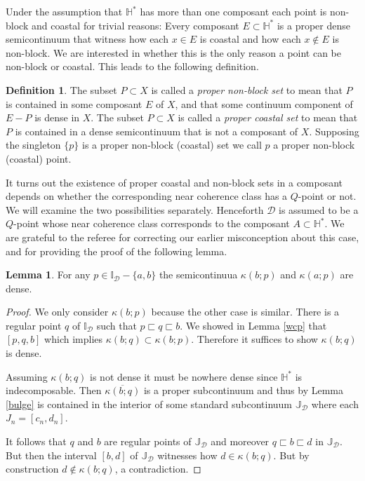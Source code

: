 \documentclass[12pt]{article}
\theoremstyle{plain}
\theoremstyle{definition}
\newtheorem{lemma}[theorem]{Lemma}
\newtheorem{definition}[theorem]{Definition}
\newcommand{\K}{\ensuremath{\kappa}}
\newcommand{\II}{\ensuremath{\mathbb I}}
\newcommand{\JJ}{\ensuremath{\mathbb J}}
\newcommand{\HH}{\ensuremath{\mathbb H}}
\newcommand{\0}{\ensuremath{\varnothing}}
\newcommand{\cD}{\ensuremath{\mathcal D}}
\begin{document}
	Under the assumption that $\HH^*$ has more than one composant each point is non-block and coastal for trivial reasons: Every composant $E \subset \HH^*$ is a proper dense semicontinuum that witness how each $x \in E$ is coastal and how each $x \notin E$ is non-block. We are interested in whether this is the only reason a point can be non-block or coastal. This leads to the following definition.
	
	\begin{definition}
		The subset $P \subset X$ is called a \textit{proper non-block set} to mean that $P$ is contained in some composant $E$ of $X$, and that some continuum component of $E-P$ is dense in $X$. The subset $P \subset X$ is called a \textit{proper coastal set} to mean that $P$ is contained in a dense semicontinuum that is not a composant of $X$. Supposing the singleton $\{p\}$ is a proper non-block (coastal) set we call $p$ a proper non-block (coastal) point.
	\end{definition}
	
	It turns out the existence of proper coastal and non-block sets in a composant depends on whether the corresponding near coherence class has a $Q$-point or not. We will examine the two possibilities separately. Henceforth $\cD$ is assumed to be a $Q$-point whose near coherence class corresponds to the composant $A \subset \HH^*$. We are grateful to the referee for correcting our earlier misconception about this case, and for providing the proof of the following lemma.
	
	\begin{lemma} \label{1}For any $p \in \II_\cD  - \{a,b\}$ the semicontinuua $\K(b;p)$ and $\K(a;p)$ are dense.\end{lemma}
	
	\begin{proof}
		We only consider $\K(b;p)$ because the other case is similar. There is a regular point $q$ of $\II_\cD$ such that $p\sqsubset q \sqsubset b$. We showed in Lemma \ref{wcp} that $[p,q,b]$ which implies $\K(b;q) \subset \K(b;p)$. Therefore it suffices to show $\K(b;q)$ is dense.
		
		Assuming $\K(b;q)$ is not dense it must be nowhere dense since $\HH^*$ is indecomposable. Then $\overline{\K(b;q)}$ is a proper subcontinuum and thus by Lemma \ref{bulge} is contained in the interior of some standard subcontinuum $\JJ_\cD$ where each $J_n = [c_n,d_n]$. 
		
		It follows that $q$ and $b$ are regular points of $\JJ_\cD$ and moreover $q \sqsubset b \sqsubset d$ in $\JJ_\cD$. But then the interval $[b,d]$ of $\JJ_\cD$ witnesses how $d \in \K(b;q)$. But by construction $d \notin \K(b;q)$, a contradiction. 
	\end{proof}
	
\end{document}

